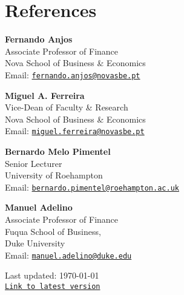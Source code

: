 \documentclass[letterpaper]{article}
\def\footerlink{https://miguelcfoliveira.github.io/CV/CV.pdf}
\begin{document}
\section*{References}
\begin{multicols}{2}
\textbf{Fernando Anjos} \\
Associate Professor of Finance \\
Nova School of Business \& Economics \\
Email: \href{mailto:fernando.anjos@novasbe.pt}{\tt fernando.anjos@novasbe.pt} 
\columnbreak \hfill

\textbf{Miguel A. Ferreira} \\
Vice-Dean of Faculty \& Research \\
Nova School of Business \& Economics \\
Email: \href{mailto:miguel.ferreira@novasbe.pt}{\tt miguel.ferreira@novasbe.pt} 
\end{multicols}

\begin{multicols}{2}
\textbf{Bernardo Melo Pimentel} \\
Senior Lecturer \\
University of Roehampton\\
Email: \href{mailto:bernardo.pimentel@roehampton.ac.uk}{\tt bernardo.pimentel@roehampton.ac.uk} 
\columnbreak \hfill

\textbf{Manuel Adelino} \\
Associate Professor of Finance \\
Fuqua School of Business, \\ 
Duke University \\
Email: \href{mailto:manuel.adelino@duke.edu}{\tt manuel.adelino@duke.edu} 
\end{multicols}

\bigskip

\begin{center}
  \begin{footnotesize}
    Last updated: \today \\
    \href{\footerlink}{\texttt{Link to latest version}}
  \end{footnotesize}
\end{center}
\end{document}
